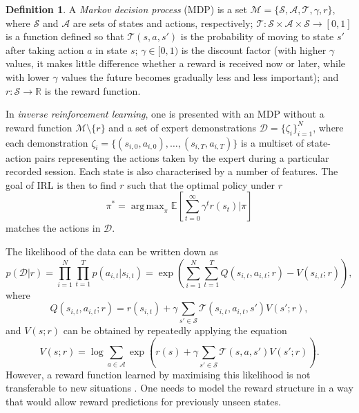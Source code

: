 \documentclass{mprop}
\theoremstyle{definition}
\newtheorem{definition}{Definition}
\DeclareMathOperator*{\argmax}{arg\,max}
\begin{document}
\begin{definition}
  A \emph{Markov decision process} (MDP) is a set $\mathcal{M} = \{ \mathcal{S},
  \mathcal{A}, \mathcal{T}, \gamma, r \}$, where $\mathcal{S}$ and
  $\mathcal{A}$ are sets of states and actions, respectively; $\mathcal{T} :
  \mathcal{S} \times \mathcal{A} \times \mathcal{S} \to [0, 1]$ is a function
  defined so that $\mathcal{T}(s, a, s')$ is the probability of moving to state $s'$
  after taking action $a$ in state $s$; $\gamma \in [0, 1)$ is the discount
  factor (with higher $\gamma$ values, it makes little difference whether a
  reward is received now or later, while with lower $\gamma$ values the future
  becomes gradually less and less important); and $r : \mathcal{S} \to
  \mathbb{R}$ is the reward function.
\end{definition}

In \emph{inverse reinforcement learning}, one is presented with an MDP without a
reward function $\mathcal{M} \setminus \{ r \}$ and a set of expert
demonstrations $\mathcal{D} = \{ \zeta_i \}_{i=1}^N$, where each demonstration
$\zeta_i = \{ (s_{i,0}, a_{i,0}), \dots, (s_{i,T}, a_{i,T}) \}$ is a multiset of
state-action pairs representing the actions taken by the expert during a
particular recorded session. Each state is also characterised by a number of
features. The goal of IRL is then to find $r$ such that the optimal policy under
$r$
\[ \pi^* = \argmax_\pi \mathbb{E}\left[ \sum_{t=0}^\infty \gamma^t r(s_t) | \pi
  \right] \]
matches the actions in $\mathcal{D}$.

The likelihood of the data can be written down as
\cite{DBLP:conf/uai/JinDAS17,DBLP:conf/nips/LevinePK11}
\begin{equation} \label{pDr}
  p(\mathcal{D} | r) = \prod_{i=1}^N \prod_{t=1}^T p(a_{i,t} | s_{i,t}) = \exp\left( \sum_{i=1}^N \sum_{t=1}^T Q(s_{i,t}, a_{i,t}; r) - V(s_{i,t}; r) \right),
\end{equation}
where
\[ Q(s_{i,t}, a_{i,t}; r) = r(s_{i,t}) + \gamma\sum_{s' \in \mathcal{S}}
  \mathcal{T}(s_{i,t}, a_{i,t}, s')V(s'; r), \]
and $V(s; r)$ can be obtained by repeatedly applying the equation
\cite{supplementary_material}
\[ V(s; r) = \log \sum_{a \in \mathcal{A}} \exp\left( r(s) + \gamma\sum_{s' \in
      \mathcal{S}} \mathcal{T}(s, a, s')V(s'; r) \right). \]
However, a reward function learned by maximising this likelihood is not
transferable to new situations
\cite{DBLP:conf/uai/JinDAS17,DBLP:conf/nips/LevinePK11}. One needs to model the
reward structure in a way that would allow reward predictions for previously
unseen states.
\end{document}
